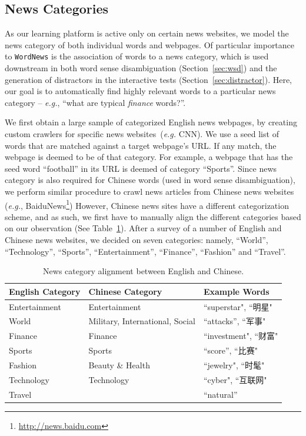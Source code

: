 \begin{CJK}{UTF8}{gbsn}
\subsection{News Categories}
\label{subsec:category}
As our learning platform is active only on certain news websites, we
model the news category of both individual words and webpages. Of
particular importance to {\tt WordNews} is the association of words to a
news category, which is used downstream in both word sense
disambiguation (Section~\ref{sec:wsd}) and the generation of
distractors in the interactive tests (Section~\ref{sec:distractor}).
Here, our goal is to automatically find highly relevant words to a
particular news category -- {\it e.g.}, ``what are typical {\it finance}
words?''.  

We first obtain a large sample of categorized English news webpages,
by creating custom crawlers for specific news websites~({\it e.g.} CNN).  We use a seed
list of words that are matched against a target webpage's URL.  If any
match, the webpage is deemed to be of that category.  For example, a
webpage that has the seed word ``football'' in its URL is deemed of
category ``Sports''.  
Since news category is  also required for Chinese words (used in word sense disambiguation), we perform similar procedure to crawl news articles from 
Chinese news websites ({\it e.g.}, BaiduNews\footnote{\url{http://news.baidu.com}})
However, Chinese news sites have a
different categorization scheme, and as such, we first have to manually
align the different categories based on our observation (See
Table~\ref{table:cat}).  After a survey of a number of English and
Chinese news websites, we decided on seven categories: namely,
``World'', ``Technology'', ``Sports'', ``Entertainment'', ``Finance'',
``Fashion'' and ``Travel''.
 

\begin{table}[ht]
\centering
  \caption{News category alignment between English and Chinese.}
  \label{table:cat}
  \begin{tabular}{| p{2.2cm} | p{2.2cm} | p{1.8cm} |}
    \hline
    {\bf English \qquad Category} & {\bf Chinese \qquad Category} & {\bf Example Words}\\
    \hline
    Entertainment & Entertainment & ``superstar", ``明星"\\
    \hline
     World &  Military, \qquad International, Social & ``attacks'', ``军事"  \\
    \hline
    Finance & Finance & ``investment", ``财富"\\
    \hline
    Sports & Sports & ``score'', ``比赛" \\
    \hline
    Fashion &  Beauty \& Health & ``jewelry", ``时髦"\\
    \hline
    Technology & Technology  & ``cyber", ``互联网"\\ \hline
    Travel  &  & ``natural'' \\
    \hline
  \end{tabular}
\end{table}




\end{CJK}
